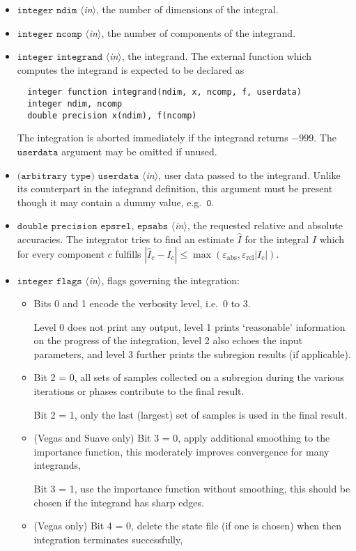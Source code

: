 \documentclass[12pt]{article}
\newcommand\ie{i.e.\ }
\newcommand\eg{e.g.\ }
\newcommand\epsabs{\varepsilon_{\text{abs}}}
\newcommand\epsrel{\varepsilon_{\text{rel}}}
\newcommand\Code[1]{\ensuremath{\texttt{#1}}}
\newcommand\VarIn[1]{\item\Code{#1} \textit{$\langle$in\/$\rangle$},}
\begin{document}
\begin{itemize}
\VarIn{integer ndim}
the number of dimensions of the integral.

\VarIn{integer ncomp}
the number of components of the integrand.

\VarIn{integer integrand}
the integrand.  The external function which computes the 
integrand is expected to be declared as
\begin{verbatim}
  integer function integrand(ndim, x, ncomp, f, userdata)
  integer ndim, ncomp
  double precision x(ndim), f(ncomp)
\end{verbatim}
The integration is aborted immediately if the integrand returns
$-999$.  The \Code{userdata} argument may be omitted if unused.

\VarIn{(arbitrary type) userdata}
user data passed to the integrand.  Unlike its counterpart in the
integrand definition, this argument must be present though it may
contain a dummy value, \eg \Code{0}.

\VarIn{double precision epsrel, epsabs}
the requested relative and absolute accuracies.
The integrator tries to find an estimate $\hat I$ for the integral $I$
which for every component $c$ fulfills $|\hat I_c - I_c|\leqslant
\max(\epsabs, \epsrel |I_c|)$.

\VarIn{integer flags}
flags governing the integration:
\begin{itemize}
\item Bits 0 and 1 encode the verbosity level, \ie 0 to 3.

Level 0 does not print any output, level 1 prints `reasonable'
information on the progress of the integration, level 2 also echoes the
input parameters, and level 3 further prints the subregion results (if
applicable).

\item Bit 2 = 0,
all sets of samples collected on a subregion during the various 
iterations or phases contribute to the final result.

Bit 2 = 1,
only the last (largest) set of samples is used in the final result.

\item (Vegas and Suave only) Bit 3 = 0,
apply additional smoothing to the importance function, this moderately
improves convergence for many integrands,

Bit 3 = 1,
use the importance function without smoothing, this should be chosen if 
the integrand has sharp edges.

\item (Vegas only) Bit 4 = 0,
delete the state file (if one is chosen) when then integration
terminates successfully,


\end{itemize}
\end{itemize}
\end{document}
